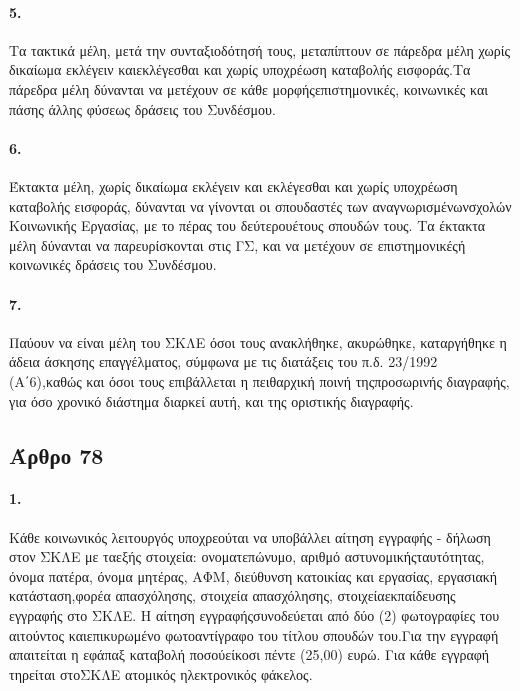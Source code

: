 \documentclass[a4paper,oneside, 10pt]{book}
\begin{document}
\paragraph { 5. } Τα τακτικά μέλη, μετά την συνταξιοδότησή τους, μεταπίπτουν σε πάρεδρα μέλη χωρίς δικαίωμα εκλέγειν καιεκλέγεσθαι και χωρίς υποχρέωση καταβολής εισφοράς.Τα πάρεδρα μέλη δύνανται να μετέχουν σε κάθε μορφήςεπιστημονικές, κοινωνικές και πάσης άλλης φύσεως δράσεις του Συνδέσμου.
\paragraph { 6. } Έκτακτα μέλη, χωρίς δικαίωμα εκλέγειν και εκλέγεσθαι και χωρίς υποχρέωση καταβολής εισφοράς, δύνανται να γίνονται οι σπουδαστές των αναγνωρισμένωνσχολών Κοινωνικής Εργασίας, με το πέρας του δεύτερουέτους σπουδών τους. Τα έκτακτα μέλη δύνανται να παρευρίσκονται στις ΓΣ, και να μετέχουν σε επιστημονικέςή κοινωνικές δράσεις του Συνδέσμου.
\paragraph { 7. } Παύουν να είναι μέλη του ΣΚΛΕ όσοι τους ανακλήθηκε, ακυρώθηκε, καταργήθηκε η άδεια άσκησης επαγγέλματος, σύμφωνα με τις διατάξεις του π.δ. 23/1992 (Α΄6),καθώς και όσοι τους επιβάλλεται η πειθαρχική ποινή τηςπροσωρινής διαγραφής, για όσο χρονικό διάστημα διαρκεί αυτή, και της οριστικής διαγραφής.
\subsection*{ Άρθρο 78 }
\paragraph { 1. } Κάθε κοινωνικός λειτουργός υποχρεούται να υποβάλλει αίτηση εγγραφής - δήλωση στον ΣΚΛΕ με ταεξής στοιχεία: ονοματεπώνυμο, αριθμό αστυνομικήςταυτότητας, όνομα πατέρα, όνομα μητέρας, ΑΦΜ, διεύθυνση κατοικίας και εργασίας, εργασιακή κατάσταση,φορέα απασχόλησης, στοιχεία απασχόλησης, στοιχείαεκπαίδευσης εγγραφής στο ΣΚΛΕ. Η αίτηση εγγραφήςσυνοδεύεται από δύο (2) φωτογραφίες του αιτούντος καιεπικυρωμένο φωτοαντίγραφο του τίτλου σπουδών του.Για την εγγραφή απαιτείται η εφάπαξ καταβολή ποσούείκοσι πέντε (25,00) ευρώ. Για κάθε εγγραφή τηρείται στοΣΚΛΕ ατομικός ηλεκτρονικός φάκελος.
\end{document}
